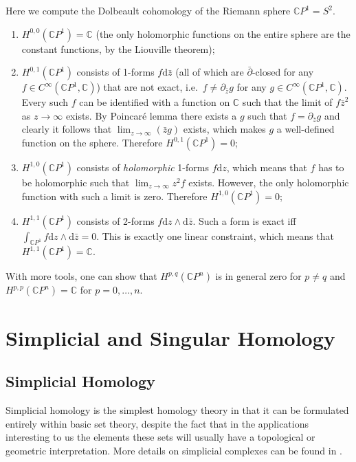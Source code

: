 \documentclass[english,letterpaper]{article}%
\numberwithin{equation}{section}
\numberwithin{figure}{section}
\numberwithin{table}{section}
\theoremstyle{definition}
\theoremstyle{definition}
\theoremstyle{definition}
\theoremstyle{plain}
\theoremstyle{plain}
\theoremstyle{plain}
\theoremstyle{plain}
\theoremstyle{remark}
\theoremstyle{remark}
\newcommand{\bbC}{\mathbb{C}}
\newcommand{\dd}{{\mathrm{d}}}
\begin{document}
\begin{example}
    Here we compute the Dolbeault cohomology of the Riemann sphere $\bbC P^1=S^2$.
    \begin{enumerate}
        \item $H^{0,0}(\bbC P^1)=\bbC$ (the only holomorphic functions on the entire sphere are the constant functions, by the Liouville theorem);
        \item $H^{0,1}(\bbC P^1)$ consists of 1-forms $f\dd\bar z$ (all of which are $\bar\partial$-closed for any $f\in C^\infty(\bbC P^1,\bbC)$) that are not exact, i.e.\ $f\neq \partial_{\bar z} g$ for any $g\in C^\infty(\bbC P^1,\bbC)$. Every such $f$ can be identified with a function on $\bbC$ such that the limit of $f \bar z^2$ as $z\to\infty$ exists. By Poincar\'e lemma there exists a $g$ such that $f=\partial_{\bar z} g$ and clearly it follows that $\lim_{z\to\infty}(\bar zg)$ exists, which makes $g$ a well-defined function on the sphere. Therefore $H^{0,1}(\bbC P^1)=0$;
        \item $H^{1,0}(\bbC P^1)$ consists of \emph{holomorphic} 1-forms $f\dd z$, which means that $f$ has to be holomorphic such that $\lim_{z\to\infty}z^2f$ exists. However, the only holomorphic function with such a limit is zero. Therefore $H^{1,0}(\bbC P^1)=0$;
        \item $H^{1,1}(\bbC P^1)$ consists of 2-forms $f\dd z\wedge\dd\bar z$. Such a form is exact iff $\int_{\bbC P^1}f\dd z\wedge\dd \bar z=0$. This is exactly one linear constraint, which means that $H^{1,1}(\bbC P^1)=\bbC$.
    \end{enumerate}
    With more tools, one can show that $H^{p,q}(\bbC P^n)$ is in general zero for $p\neq q$ and $H^{p,p}(\bbC P^n)=\bbC$ for $p=0,\ldots,n$.
\end{example}





\section{Simplicial and Singular Homology}


\subsection{Simplicial Homology}

Simplicial homology is the simplest homology theory in that it can be formulated entirely within basic set theory, despite the fact that in the applications interesting to us the elements these sets will usually have a topological or geometric interpretation. More details on simplicial complexes can be found in \cite{tomDieck}.
\end{document}
